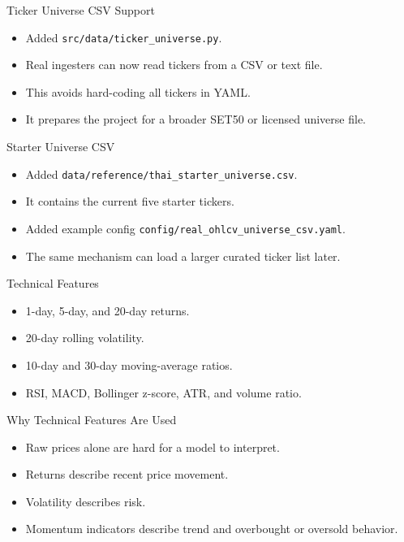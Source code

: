 \documentclass[aspectratio=43,10pt]{beamer}
\begin{document}
\begin{frame}{Ticker Universe CSV Support}
\begin{itemize}
  \item Added \texttt{src/data/ticker\_universe.py}.
  \item Real ingesters can now read tickers from a CSV or text file.
  \item This avoids hard-coding all tickers in YAML.
  \item It prepares the project for a broader SET50 or licensed universe file.
\end{itemize}
\end{frame}

\begin{frame}{Starter Universe CSV}
\begin{itemize}
  \item Added \texttt{data/reference/thai\_starter\_universe.csv}.
  \item It contains the current five starter tickers.
  \item Added example config \texttt{config/real\_ohlcv\_universe\_csv.yaml}.
  \item The same mechanism can load a larger curated ticker list later.
\end{itemize}
\end{frame}

\begin{frame}{Technical Features}
\begin{itemize}
  \item 1-day, 5-day, and 20-day returns.
  \item 20-day rolling volatility.
  \item 10-day and 30-day moving-average ratios.
  \item RSI, MACD, Bollinger z-score, ATR, and volume ratio.
\end{itemize}
\end{frame}

\begin{frame}{Why Technical Features Are Used}
\begin{itemize}
  \item Raw prices alone are hard for a model to interpret.
  \item Returns describe recent price movement.
  \item Volatility describes risk.
  \item Momentum indicators describe trend and overbought or oversold behavior.
\end{itemize}
\end{frame}
\end{document}

